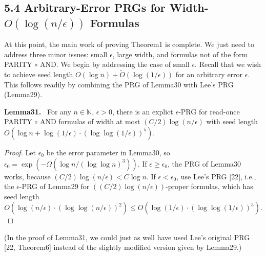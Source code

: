 \documentclass[10pt,a4paper]{article}
\newenvironment{authorclaim}[1]{\par\medskip\noindent\textbf{#1.}\ \ignorespaces}{\par\medskip}
\begin{document}
\subsection*{5.4 Arbitrary-Error PRGs for Width-$O(\log(n/\epsilon))$ Formulas}
At this point, the main work of proving Theorem1 is complete. We just need to address three minor issues: small $\epsilon$, large width, and formulas not of the form PARITY $\circ$ AND. We begin by addressing the case of small $\epsilon$. Recall that we wish to achieve seed length $O(\log n)+\widetilde O(\log(1/\epsilon))$ for an arbitrary error $\epsilon$. This follows readily by combining the PRG of Lemma30 with Lee's PRG (Lemma29).
\begin{authorclaim}{Lemma31}
For any $n\in\mathbb N$, $\epsilon>0$, there is an explict $\epsilon$-PRG for read-once PARITY $\circ$ AND formulas of width at most $(C/2)\log(n/\epsilon)$ with seed length $O(\log n+\log(1/\epsilon)\cdot(\log\log(1/\epsilon))^5)$.
\end{authorclaim}
\begin{proof}
Let $\epsilon_0$ be the error parameter in Lemma30, so $\epsilon_0=\exp(-\Omega(\log n/(\log\log n)^3))$. If $\epsilon\ge\epsilon_0$, the PRG of Lemma30 works, because $(C/2)\log(n/\epsilon)<C\log n$. If $\epsilon<\epsilon_0$, use Lee's PRG [22], i.e., the $\epsilon$-PRG of Lemma29 for $((C/2)\log(n/\epsilon))$-proper formulas, which has seed length
\[
O(\log(n/\epsilon)\cdot(\log\log(n/\epsilon))^2)
\le O(\log(1/\epsilon)\cdot(\log\log(1/\epsilon))^5).
\]
\end{proof}
(In the proof of Lemma31, we could just as well have used Lee's original PRG [22, Theorem6] instead of the slightly modified version given by Lemma29.)
\end{document}
